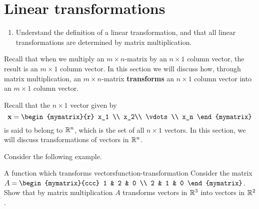 \section{Linear transformations}

\begin{outcome}
  \begin{enumerate}
  \item Understand the definition of a linear transformation, and that
    all linear transformations are determined by matrix
    multiplication.
  \end{enumerate}
\end{outcome}

Recall that when we multiply an $m\times n$-matrix by an $n\times 1 $
column vector, the result is an $m\times 1$ column vector. In this
section we will discuss how, through matrix multiplication, an $m
\times n$-matrix \textbf{transforms} an $n\times 1$ column vector into
an $m \times 1$ column vector.

Recall that the $n \times 1$ vector given by
\begin{equation*}
\vect{x} = 
\begin{mymatrix}{r}
x_1 \\
x_2\\ 
\vdots \\
x_n
\end{mymatrix}
\end{equation*}
is said to belong to $\mathbb{R}^n$, which is the set of all $n \times 1$ vectors. In this section, we will discuss transformations of vectors in $\mathbb{R}^n$. 

Consider the following example. 

\begin{example}{A function which transforms vectors}{function-transformation}
Consider the matrix $A = \begin{mymatrix}{ccc}
1 & 2 & 0 \\
2 & 1 & 0
\end{mymatrix}$. 
Show that by matrix multiplication $A$ transforms vectors in $\mathbb{R}^3$ into vectors in $\mathbb{R}^2$.
\end{example}

